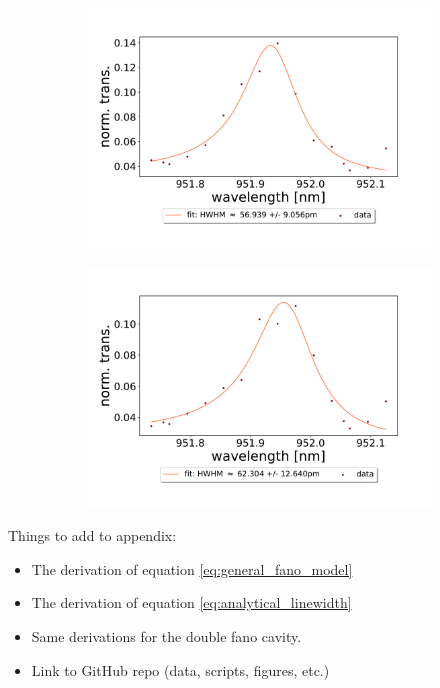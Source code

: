 \begin{figure}[h!] \ContinuedFloat
    \centering
    \begin{subfigure}[b]{0.49\textwidth}
        \includegraphics[width=\textwidth]{figures/results/double fano fits/20250326/21um_M3:M5_fit_13.pdf}
        \caption{}
        \label{fig:21um_M3:M5_fit_13}
    \end{subfigure}
    \begin{subfigure}[b]{0.49\textwidth}
        \includegraphics[width=\textwidth]{figures/results/double fano fits/20250326/21um_M3:M5_fit_14.pdf}
        \caption{}
        \label{fig:21um_M3:M5_fit_14}
    \end{subfigure}
\end{figure}

\clearpage
Things to add to appendix:
\begin{itemize}
    \item The derivation of equation \ref{eq:general_fano_model}
    \item The derivation of equation \ref{eq:analytical_linewidth}
    \item Same derivations for the double fano cavity.
    \item Link to GitHub repo (data, scripts, figures, etc.)
\end{itemize}